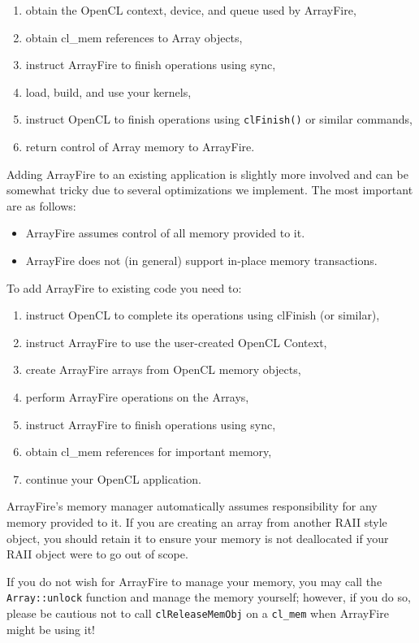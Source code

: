 \begin{enumerate}
\item obtain the OpenCL context, device, and queue used by ArrayFire,
\item obtain cl_mem references to Array objects,
\item instruct ArrayFire to finish operations using sync,
\item load, build, and use your kernels,
\item instruct OpenCL to finish operations using \texttt{clFinish()} or similar commands,
\item return control of Array memory to ArrayFire.
\end{enumerate}

Adding ArrayFire to an existing application is slightly more involved and can be somewhat tricky due to several optimizations we implement. The most important are as follows:

\begin{itemize}
\item ArrayFire assumes control of all memory provided to it.
\item ArrayFire does not (in general) support in-place memory transactions.
\end{itemize}

To add ArrayFire to existing code you need to:

\begin{enumerate}
\item instruct OpenCL to complete its operations using clFinish (or similar),
\item instruct ArrayFire to use the user-created OpenCL Context,
\item create ArrayFire arrays from OpenCL memory objects,
\item perform ArrayFire operations on the Arrays,
\item instruct ArrayFire to finish operations using sync,
\item obtain cl_mem references for important memory,
\item continue your OpenCL application.
\end{enumerate}
	
ArrayFire's memory manager automatically assumes responsibility for any memory provided to it. If you are creating an array from another RAII style object, you should retain it to ensure your memory is not deallocated if your RAII object were to go out of scope.

If you do not wish for ArrayFire to manage your memory, you may call the \texttt{Array::unlock} function and manage the memory yourself; however, if you do so, please be cautious not to call \texttt{clReleaseMemObj} on a \texttt{cl_mem} when ArrayFire might be using it!

